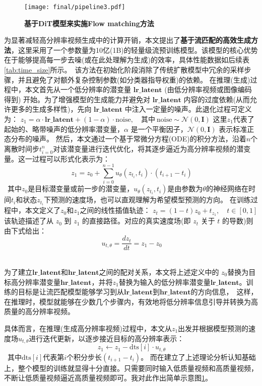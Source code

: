 \begin{figure}[htbp]
    \centering
    \texttt{[image: final/pipeline3.pdf]}
    \caption{\textbf{基于DiT模型来实施Flow matching方法}
    }
    \label{fig:Flow matching}
\end{figure}

为显著减轻高分辨率视频生成中的计算开销，本文提出了\textbf{基于流匹配的高效生成方法}，这里采用了一个参数量为10亿(1B)的轻量级流预训练模型。该模型的核心优势在于能够提高每一步去噪(或在此处理解为生成)的效率，具体性能数据如后续表\ref{tab:time_size}所示。\
该方法在初始化阶段消除了传统扩散模型中冗余的采样步骤，并且避免了对额外复杂控制参数(如分类器指导权重)的依赖。
在推理(生成)过程中，本文首先从一个低分辨率的潜变量 $\mathbf{lr\_latent}$ (由低分辨率视频或图像编码得到) 开始。为了增强模型的生成能力并避免对 $\mathbf{lr\_latent}$ 内容的过度依赖(从而允许更多的生成多样性)，先向 $\mathbf{lr\_latent}$ 中注入一定量的噪声。此退化过程可定义为：
$z_1 = \alpha \cdot \mathbf{lr\_latent} + (1 - \alpha) \cdot \text{noise}, \quad \text{其中} \ \text{noise} \sim \mathcal{N}(0, \mathbf{I})$
这里$z_1$代表了起始的、略带噪声的低分辨率潜变量，$\alpha$ 是一个平衡因子，$\mathcal{N}(0, \mathbf{I})$ 表示标准正态分布的噪声。
然后，本文通过一个基于常微分方程(ODE)的积分方法，沿着$n$个离散时间步$t_{i=0}^n$对该潜变量进行迭代优化，将其逐步逼近为高分辨率视频的潜变量。这一过程可以形式化表示为：
\[\
z_1 = z_0 + \sum_{i=0}^{n-1} u_\theta(z_{t_i}, t_i) \cdot (t_{i+1} - t_i)
\]\
其中$z_0$是目标潜变量或前一步的潜变量，$u_\theta(z_{t_i}, t_i)$是由参数为$\theta$的神经网络在时间$t_i$和状态$z_{t_i}$下预测的速度场，也可以直观理解为希望模型预测的方向。
在训练过程中，本文定义了$z_0$和$z_1$之间的线性插值轨迹：
$z_t = (1 - t) z_0 + t_{z_1}, \quad t \in [0,1]$
该轨迹描述了从 $z_0$ 到 $z_1$ 的直接路径。对应的真实速度场(即 $z_t$ 关于 $t$ 的导数)则由下式给出：\[\ 
u_{t,\theta} = \frac{dz_t}{dt} = z_1 - z_0
\]\

为了建立$\mathbf{lr\_latent}$和$\mathbf{hr\_latent}$之间的配对关系，本文将上述定义中的 $z_0$替换为目标高分辨率潜变量$\mathbf{hr\_latent}$，并将$z_1$替换为输入的低分辨率潜变量$\mathbf{lr\_latent}$。训练的目标是让流匹配模型能够学习到从$\mathbf{lr\_latent}$到$\mathbf{hr\_latent}$的方向信息，\
这样，在推理时，模型就能够在少数几个步骤内，有效地将低分辨率信息引导并转换为高质量的高分辨率视频。


具体而言，在推理(生成高分辨率视频)过程中，本文从$z_1$出发并根据模型预测的速度场$u_{t,\theta}$进行迭代更新，以逐步接近目标的高分辨率表示：
\[\ 
z_1 \leftarrow z_1 - \text{dts}[i] \cdot u_{t,\theta}
\]\, 其中$\text{dts}[i]$代表第$i$个积分步长$(t_{i+1} - t_{i})$。
而在建立了上述理论分析认知基础上，整个模型的训练就显得十分直接。只需要同时输入低质量视频和高质量视频，不断让低质量视频逼近高质量视频即可。我对此作出简单示意图\ref{fig:Flow matching}。


